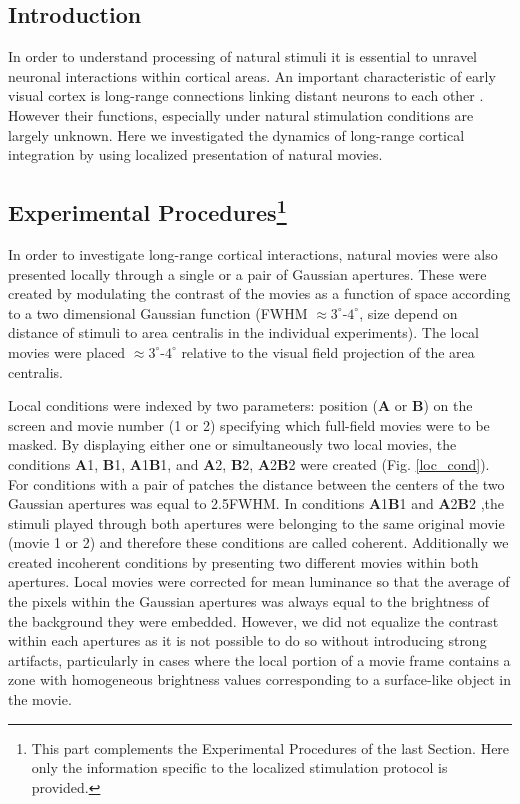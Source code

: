 \subsection{Introduction}



In order to understand processing of natural stimuli it is essential to
unravel neuronal interactions within cortical areas. An important
characteristic of early visual cortex is long-range connections linking
distant neurons to each other \citep{rockland1982a, gilbert1989a}. However
their functions, especially under natural stimulation conditions are
largely unknown. Here we investigated the dynamics of long-range cortical
integration by using localized presentation of natural movies.



\subsection[]{Experimental Procedures\footnote{This part complements the
Experimental Procedures of the last Section. Here only the information
specific to the localized stimulation protocol is provided.}}

\label{local_mm}

In order to investigate long-range cortical interactions, natural movies
were also presented locally through a single or a pair of Gaussian
apertures. These were created by modulating the contrast of the movies as a
function of space according to a two dimensional Gaussian function (FWHM
$\approx3^{\circ}$-$4^{\circ}$, size depend on distance of stimuli to area
centralis in the individual experiments).  The local movies were placed $\approx3^{\circ}$-$4^{\circ}$
relative to the visual field projection of the area centralis.

Local conditions were indexed by two parameters: position (\textbf{A} or
\textbf{B}) on the screen and movie number (1 or 2) specifying which
full-field movies were to be masked. By displaying either one or
simultaneously two local movies, the conditions \textbf{A}1, \textbf{B}1,
\textbf{A}1\textbf{B}1, and \textbf{A}2, \textbf{B}2,
\textbf{A}2\textbf{B}2 were created (Fig. \ref{loc_cond}). For conditions
with a pair of patches the distance between the centers of the two Gaussian
apertures was equal to 2.5\texttimes FWHM. In conditions
\textbf{A}1\textbf{B}1 and \textbf{A}2\textbf{B}2 ,the stimuli played
through both apertures were belonging to the same original movie (movie 1
or 2) and therefore these conditions are called coherent. Additionally we
created incoherent conditions by presenting two different movies within
both apertures. Local movies were corrected for mean luminance so that the
average of the pixels within the Gaussian apertures was always equal to the
brightness of the background they were embedded. However, we did not
equalize the contrast within each apertures as it is not possible to do so
without introducing strong artifacts, particularly in cases where the local
portion of a movie frame contains a zone with homogeneous brightness values
corresponding to a surface-like object in the movie.

